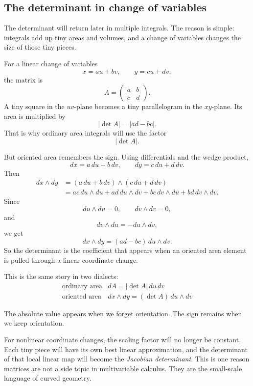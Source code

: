 \subsection{The determinant in change of variables}

The determinant will return later in multiple integrals.  The reason is simple: integrals
add up tiny areas and volumes, and a change of variables changes the size of those tiny
pieces.

For a linear change of variables
\[
    x=au+bv,
    \qquad
    y=cu+dv,
\]
the matrix is
\[
    A=
    \begin{pmatrix}
        a&b\\
        c&d
    \end{pmatrix}.
\]
A tiny square in the \(uv\)-plane becomes a tiny parallelogram in the \(xy\)-plane.
Its area is multiplied by
\[
    |\det A|=|ad-bc|.
\]
That is why ordinary area integrals will use the factor
\[
    |\det A|.
\]

But oriented area remembers the sign.  Using differentials and the wedge product,
\[
    dx=a\,du+b\,dv,
    \qquad
    dy=c\,du+d\,dv.
\]
Then
\[
\begin{aligned}
    dx\wedge dy
    &=
    (a\,du+b\,dv)\wedge(c\,du+d\,dv)\\
    &=
    ac\,du\wedge du
    +ad\,du\wedge dv
    +bc\,dv\wedge du
    +bd\,dv\wedge dv.
\end{aligned}
\]
Since
\[
    du\wedge du=0,
    \qquad
    dv\wedge dv=0,
\]
and
\[
    dv\wedge du=-du\wedge dv,
\]
we get
\[
\boxed{
    dx\wedge dy=(ad-bc)\,du\wedge dv.
}
\]
So the determinant is the coefficient that appears when an oriented area element is
pulled through a linear coordinate change.

This is the same story in two dialects:
\[
\begin{array}{c|c}
\text{ordinary area} & dA=|\det A|\,du\,dv\\[0.4em]
\text{oriented area} & dx\wedge dy=(\det A)\,du\wedge dv
\end{array}
\]

The absolute value appears when we forget orientation.  The sign remains when we keep
orientation.

For nonlinear coordinate changes, the scaling factor will no longer be constant.  Each
tiny piece will have its own best linear approximation, and the determinant of that local
linear map will become the \emph{Jacobian determinant}.  This is one reason matrices are
not a side topic in multivariable calculus.  They are the small-scale language of curved
geometry.

